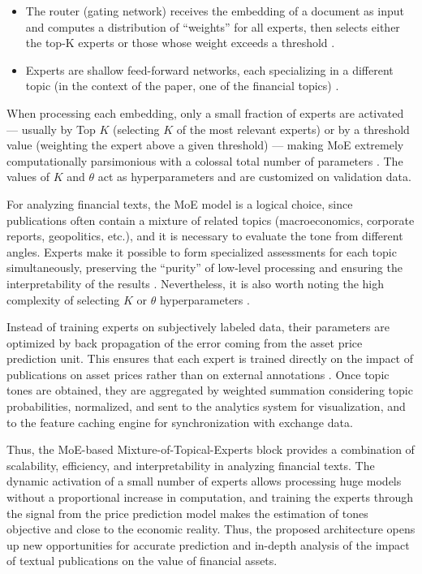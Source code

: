 \begin{itemize}
    \item The router (gating network) receives the embedding of a document as input and computes a distribution
    of “weights” for all experts, then selects either the top-K experts or those whose weight exceeds a threshold
    \parencite{fedus2022switch}.
    \item Experts are shallow feed-forward networks, each specializing in a different topic (in the context
    of the paper, one of the financial topics) \parencite{shazeer2017outrageously}.
\end{itemize}

When processing each embedding, only a small fraction of experts are activated --- usually by Top $K$ (selecting $K$
of the most relevant experts) or by a threshold value (weighting the expert above a given threshold) --- making MoE
extremely computationally parsimonious with a colossal total number of parameters \parencite{fedus2022switch}.
The values of $K$ and $\theta$ act as hyperparameters and are customized on validation data.

For analyzing financial texts, the MoE model is a logical choice, since publications often contain a mixture
of related topics (macroeconomics, corporate reports, geopolitics, etc.), and it is necessary to evaluate the tone
from different angles. Experts make it possible to form specialized assessments for each topic simultaneously,
preserving the “purity” of low-level processing and ensuring the interpretability of the results \parencite{jacobs1991adaptive}.
Nevertheless, it is also worth noting the high complexity of selecting $K$ or $\theta$ hyperparameters
\parencite{jacobs1991adaptive}.

Instead of training experts on subjectively labeled data, their parameters are optimized by back propagation of the error
coming from the asset price prediction unit. This ensures that each expert is trained directly on the impact of publications
on asset prices rather than on external annotations \parencite{shazeer2017outrageously}. Once topic tones are obtained,
they are aggregated by weighted summation considering topic probabilities, normalized, and sent to the analytics system
for visualization, and to the feature caching engine for synchronization with exchange data.

Thus, the MoE-based Mixture-of-Topical-Experts block provides a combination of scalability, efficiency, and interpretability
in analyzing financial texts. The dynamic activation of a small number of experts allows processing huge models without
a proportional increase in computation, and training the experts through the signal from the price prediction model makes
the estimation of tones objective and close to the economic reality. Thus, the proposed architecture opens up new opportunities
for accurate prediction and in-depth analysis of the impact of textual publications on the value of financial assets.


